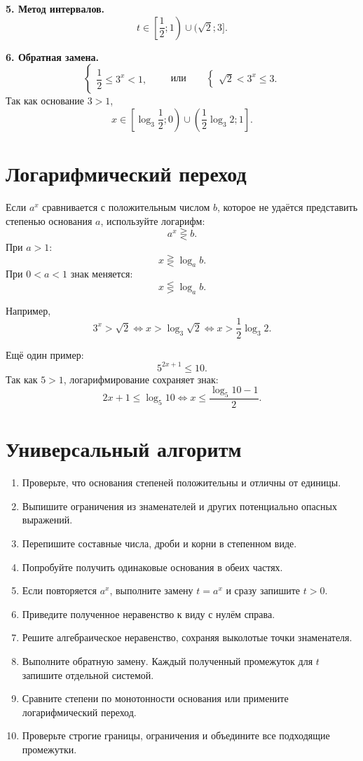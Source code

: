 \documentclass[a4paper,12pt]{article}
\newcommand{\key}[1]{\textcolor{accent}{\textbf{#1}}}
\begin{document}
\key{5. Метод интервалов.}
\[
t\in\left[\frac12;1\right)\cup(\sqrt2;3].
\]

\key{6. Обратная замена.}
\[
\begin{cases}
\dfrac12\le3^x<1,
\end{cases}
\qquad\text{или}\qquad
\begin{cases}
\sqrt2<3^x\le3.
\end{cases}
\]
Так как основание $3>1$,
\[
\boxed{
x\in\left[\log_3\frac12;0\right)
\cup
\left(\frac12\log_3 2;1\right].
}
\]

\section{Логарифмический переход}

Если $a^x$ сравнивается с положительным числом $b$, которое не удаётся представить степенью основания $a$, используйте логарифм:
\[
a^x\gtreqless b.
\]
При $a>1$:
\[
x\gtreqless\log_a b.
\]
При $0<a<1$ знак меняется:
\[
x\lesseqgtr\log_a b.
\]

Например,
\[
3^x>\sqrt2
\iff x>\log_3\sqrt2
\iff x>\frac12\log_3 2.
\]

Ещё один пример:
\[
5^{2x+1}\le10.
\]
Так как $5>1$, логарифмирование сохраняет знак:
\[
2x+1\le\log_5 10
\iff
\boxed{x\le\frac{\log_5 10-1}{2}}.
\]

\section{Универсальный алгоритм}

\begin{enumerate}
  \item Проверьте, что основания степеней положительны и отличны от единицы.
  \item Выпишите ограничения из знаменателей и других потенциально опасных выражений.
  \item Перепишите составные числа, дроби и корни в степенном виде.
  \item Попробуйте получить одинаковые основания в обеих частях.
  \item Если повторяется $a^x$, выполните замену $t=a^x$ и сразу запишите $t>0$.
  \item Приведите полученное неравенство к виду с нулём справа.
  \item Решите алгебраическое неравенство, сохраняя выколотые точки знаменателя.
  \item Выполните обратную замену. Каждый полученный промежуток для $t$ запишите отдельной системой.
  \item Сравните степени по монотонности основания или примените ло\-га\-риф\-ми\-че\-ский переход.
  \item Проверьте строгие границы, ограничения и объедините все подходящие промежутки.
\end{enumerate}
\end{document}
